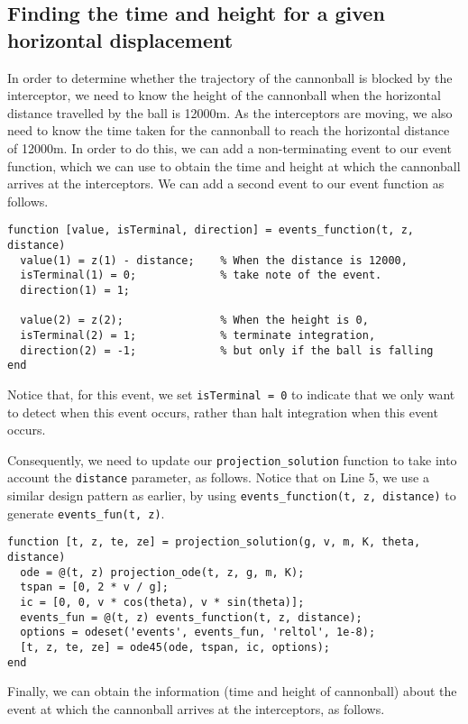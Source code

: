 \subsection{Finding the time and height for a given horizontal displacement}
In order to determine whether the trajectory of the cannonball is blocked by the interceptor, we need to know the height of the cannonball when the horizontal distance travelled by the ball is 12000m. As the interceptors are moving, we also need to know the time taken for the cannonball to reach the horizontal distance of 12000m. In order to do this, we can add a non-terminating event to our event function, which we can use to obtain the time and height at which the cannonball arrives at the interceptors. We can add a second event to our event function as follows.

\begin{lstlisting}
function [value, isTerminal, direction] = events_function(t, z, distance)
  value(1) = z(1) - distance;    % When the distance is 12000,
  isTerminal(1) = 0;             % take note of the event.
  direction(1) = 1;
  
  value(2) = z(2);               % When the height is 0,
  isTerminal(2) = 1;             % terminate integration,
  direction(2) = -1;             % but only if the ball is falling
end
\end{lstlisting}

\noindent
Notice that, for this event, we set \lstinline|isTerminal = 0| to indicate that we only want to detect when this event occurs, rather than halt integration when this event occurs.

\newpage
\noindent
Consequently, we need to update our \lstinline|projection_solution| function to take into account the \lstinline|distance| parameter, as follows. Notice that on Line 5, we use a similar design pattern as earlier, by using \lstinline|events_function(t, z, distance)| to generate \lstinline|events_fun(t, z)|.

\begin{lstlisting}
function [t, z, te, ze] = projection_solution(g, v, m, K, theta, distance)
  ode = @(t, z) projection_ode(t, z, g, m, K);
  tspan = [0, 2 * v / g];
  ic = [0, 0, v * cos(theta), v * sin(theta)];
  events_fun = @(t, z) events_function(t, z, distance);
  options = odeset('events', events_fun, 'reltol', 1e-8);
  [t, z, te, ze] = ode45(ode, tspan, ic, options);
end
\end{lstlisting}

\noindent
Finally, we can obtain the information (time and height of cannonball) about the event at which the cannonball arrives at the interceptors, as follows.

